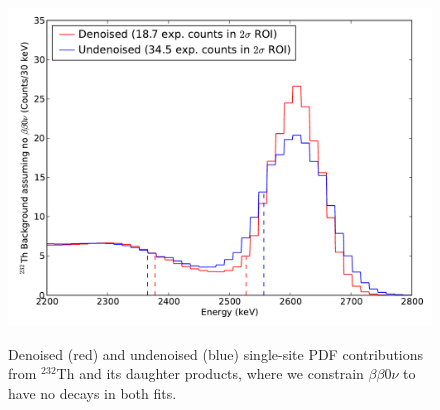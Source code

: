 \begin{figure}
\begin{center}
\includegraphics[keepaspectratio=true,width=\textwidth]{DenoisedVsUndenoised_SSPdf_ThOnly.pdf}
\end{center}
\renewcommand{\baselinestretch}{1}
\small\normalsize
\begin{quote}
\caption{Denoised (red) and undenoised (blue) single-site PDF contributions from $^{232}$Th and its daughter products, where we constrain $\beta\beta 0\nu$ to have no decays in both fits.}
\label{fig:DenoisedComparison_PdfComponentsTh}
\end{quote}
\end{figure}
\renewcommand{\baselinestretch}{2}
\small\normalsize

